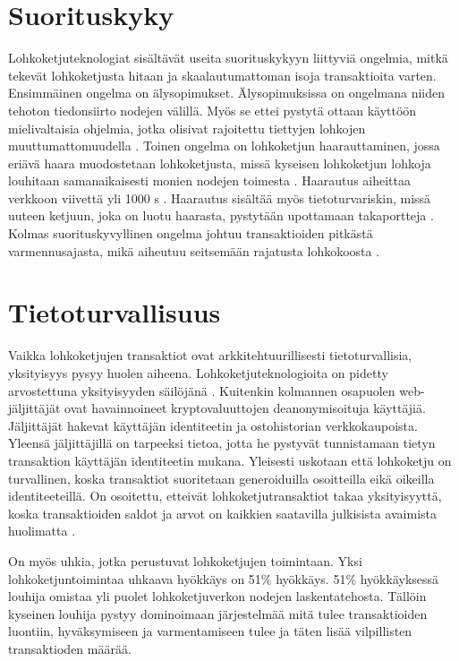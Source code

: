 \documentclass[utf8,bachelor]{gradu3}
\begin{document}
\section{Suorituskyky}
Lohkoketjuteknologiat sisältävät useita suorituskykyyn liittyviä ongelmia, mitkä tekevät lohkoketjusta hitaan ja skaalautumattoman isoja transaktioita varten.
Ensimmäinen ongelma on älysopimukset. Älysopimuksissa on ongelmana niiden tehoton tiedonsiirto nodejen välillä. Myös se ettei pystytä ottaan käyttöön mielivaltaisia ohjelmia, jotka olisivat rajoitettu tiettyjen lohkojen muuttumattomuudella \parencite{yang2019survey}.
Toinen ongelma on lohkoketjun haarauttaminen, jossa eriävä haara muodostetaan lohkoketjusta, missä kyseisen lohkoketjun lohkoja louhitaan samanaikaisesti monien nodejen toimesta \parencite{da2019analysis}. 
Haarautus aiheittaa verkkoon viivettä yli 1000 s \parencite{mivsic2019forks}.
Haarautus sisältää myös tietoturvariskin, missä uuteen ketjuun, joka on luotu haarasta, pystytään upottamaan takaportteja \parencite{wang2019corking}.
Kolmas suorituskyvyllinen ongelma johtuu transaktioiden pitkästä varmennusajasta, mikä aiheutuu seitsemään rajatusta lohkokoosta \parencite{yang2019survey}.


\section{Tietoturvallisuus}
Vaikka lohkoketjujen transaktiot ovat arkkitehtuurillisesti tietoturvallisia, yksityisyys pysyy huolen aiheena.
Lohkoketjuteknologioita on pidetty arvostettuna yksityisyyden säilöjänä \parencite{de2016interplay}.
Kuitenkin kolmannen osapuolen web-jäljittäjät ovat havainnoineet kryptovaluuttojen deanonymisoituja käyttäjiä. Jäljittäjät hakevat käyttäjän identiteetin ja ostohistorian verkkokaupoista. Yleensä jäljittäjillä on tarpeeksi tietoa, jotta he pystyvät tunnistamaan tietyn transaktion käyttäjän identiteetin mukana. \parencite{goldfeder2017cookie}
Yleisesti uskotaan että lohkoketju on turvallinen, koska transaktiot suoritetaan generoiduilla osoitteilla eikä oikeilla identiteeteillä.
On osoitettu, etteivät lohkoketjutransaktiot takaa yksityisyyttä, koska transaktioiden saldot ja arvot on kaikkien saatavilla julkisista avaimista huolimatta \parencite{kosba2016hawk}.

On myös uhkia, jotka perustuvat lohkoketjujen toimintaan. Yksi lohkoketjuntoimintaa uhkaava hyökkäys on 51\% hyökkäys. 51\% hyökkäyksessä louhija omistaa yli puolet lohkoketjuverkon nodejen laskentatehosta. Tällöin kyseinen louhija pystyy dominoimaan järjestelmää mitä tulee transaktioiden luontiin, hyväksymiseen ja varmentamiseen tulee ja täten lisää vilpillisten transaktioden määrää.
\end{document}
